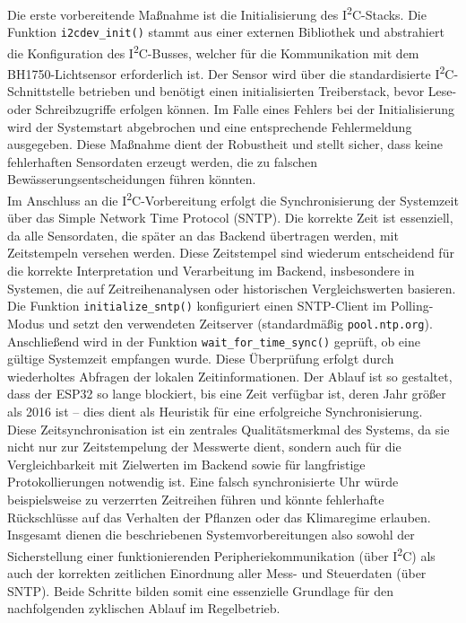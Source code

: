 \noindent Die erste vorbereitende Maßnahme ist die Initialisierung des I\textsuperscript{2}C-Stacks. Die Funktion \texttt{i2cdev\_init()} stammt aus einer externen Bibliothek und abstrahiert die Konfiguration des I\textsuperscript{2}C-Busses, welcher für die Kommunikation mit dem BH1750-Lichtsensor erforderlich ist. Der Sensor wird über die standardisierte I\textsuperscript{2}C-Schnittstelle betrieben und benötigt einen initialisierten Treiberstack, bevor Lese- oder Schreibzugriffe erfolgen können. Im Falle eines Fehlers bei der Initialisierung wird der Systemstart abgebrochen und eine entsprechende Fehlermeldung ausgegeben. Diese Maßnahme dient der Robustheit und stellt sicher, dass keine fehlerhaften Sensordaten erzeugt werden, die zu falschen Bewässerungsentscheidungen führen könnten.
\\
Im Anschluss an die I\textsuperscript{2}C-Vorbereitung erfolgt die Synchronisierung der Systemzeit über das Simple Network Time Protocol (SNTP). Die korrekte Zeit ist essenziell, da alle Sensordaten, die später an das Backend übertragen werden, mit Zeitstempeln versehen werden. Diese Zeitstempel sind wiederum entscheidend für die korrekte Interpretation und Verarbeitung im Backend, insbesondere in Systemen, die auf Zeitreihenanalysen oder historischen Vergleichswerten basieren.
\\
Die Funktion \texttt{initialize\_sntp()} konfiguriert einen SNTP-Client im Polling-Modus und setzt den verwendeten Zeitserver (standardmäßig \texttt{pool.ntp.org}). Anschließend wird in der Funktion \texttt{wait\_for\_time\_sync()} geprüft, ob eine gültige Systemzeit empfangen wurde. Diese Überprüfung erfolgt durch wiederholtes Abfragen der lokalen Zeitinformationen. Der Ablauf ist so gestaltet, dass der ESP32 so lange blockiert, bis eine Zeit verfügbar ist, deren Jahr größer als 2016 ist – dies dient als Heuristik für eine erfolgreiche Synchronisierung.
\\
Diese Zeitsynchronisation ist ein zentrales Qualitätsmerkmal des Systems, da sie nicht nur zur Zeitstempelung der Messwerte dient, sondern auch für die Vergleichbarkeit mit Zielwerten im Backend sowie für langfristige Protokollierungen notwendig ist. Eine falsch synchronisierte Uhr würde beispielsweise zu verzerrten Zeitreihen führen und könnte fehlerhafte Rückschlüsse auf das Verhalten der Pflanzen oder das Klimaregime erlauben.
\\
Insgesamt dienen die beschriebenen Systemvorbereitungen also sowohl der Sicherstellung einer funktionierenden Peripheriekommunikation (über I\textsuperscript{2}C) als auch der korrekten zeitlichen Einordnung aller Mess- und Steuerdaten (über SNTP). Beide Schritte bilden somit eine essenzielle Grundlage für den nachfolgenden zyklischen Ablauf im Regelbetrieb.

